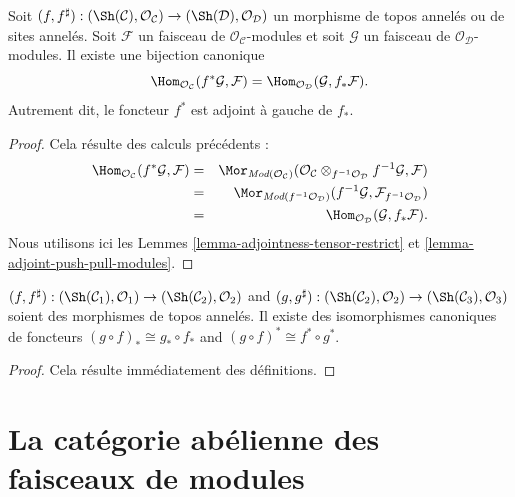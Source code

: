 \begin{lemma}
\label{lemma-adjoint-pullback-pushforward-modules}
Soit
$(f, f^\sharp) :
(\Sh(\mathcal{C}), \mathcal{O}_\mathcal{C})
\to
(\Sh(\mathcal{D}), \mathcal{O}_\mathcal{D})$
un morphisme de topos annelés ou de sites annelés. Soit $\mathcal{F}$ un
faisceau de $\mathcal{O}_\mathcal{C}$-modules et soit $\mathcal{G}$ un faisceau
de $\mathcal{O}_\mathcal{D}$-modules. Il existe une bijection canonique
$$
\Hom_{\mathcal{O}_\mathcal{C}}(f^*\mathcal{G}, \mathcal{F})
=
\Hom_{\mathcal{O}_\mathcal{D}}(\mathcal{G}, f_*\mathcal{F}).
$$
Autrement dit, le foncteur $f^*$ est adjoint à gauche de $f_*$.
\end{lemma}

\begin{proof}
Cela résulte des calculs précédents :
\begin{eqnarray*}
\Hom_{\mathcal{O}_\mathcal{C}}(f^*\mathcal{G}, \mathcal{F})
& = &
\Mor_{\textit{Mod}(\mathcal{O}_\mathcal{C})}(
\mathcal{O}_\mathcal{C}
\otimes_{f^{-1}\mathcal{O}_\mathcal{D}} f^{-1}\mathcal{G},
\mathcal{F}) \\
& = &
\Mor_{\textit{Mod}(f^{-1}\mathcal{O}_\mathcal{D})}(
f^{-1}\mathcal{G}, \mathcal{F}_{f^{-1}\mathcal{O}_\mathcal{D}}) \\
& = &
\Hom_{\mathcal{O}_\mathcal{D}}(\mathcal{G}, f_*\mathcal{F}).
\end{eqnarray*}
Nous utilisons ici les Lemmes \ref{lemma-adjointness-tensor-restrict} et
\ref{lemma-adjoint-push-pull-modules}.
\end{proof}

\begin{lemma}
\label{lemma-push-pull-composition-modules}
$(f, f^\sharp) :
(\Sh(\mathcal{C}_1), \mathcal{O}_1)
\to (\Sh(\mathcal{C}_2), \mathcal{O}_2)$ and
$(g, g^\sharp) :
(\Sh(\mathcal{C}_2), \mathcal{O}_2) \to
(\Sh(\mathcal{C}_3), \mathcal{O}_3)$
soient des morphismes de topos annelés. Il existe des isomorphismes canoniques
de foncteurs
$(g \circ f)_* \cong g_* \circ f_*$ and
$(g \circ f)^* \cong f^* \circ g^*$.
\end{lemma}

\begin{proof}
Cela résulte immédiatement des définitions.
\end{proof}





\section{La catégorie abélienne des faisceaux de modules}
\label{section-kernels}


